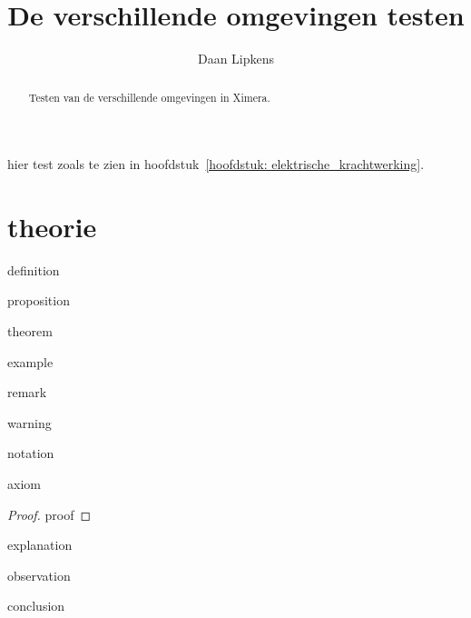 \documentclass{ximera}
\title{De verschillende omgevingen testen}
\author{Daan Lipkens}
\begin{document}
 \begin{abstract}
     Testen van de verschillende omgevingen in Ximera.
 \end{abstract}
\maketitle

hier test zoals te zien in hoofdstuk~\ref{hoofdstuk: elektrische_krachtwerking}.

\section{theorie}
\begin{definition}
definition
\end{definition}

\begin{proposition}
proposition
\end{proposition}

\begin{theorem}
theorem
\end{theorem}

\begin{example}
example
\end{example}

\begin{remark}
remark
\end{remark}

\begin{warning}
warning
\end{warning}

\begin{notation}
notation
\end{notation}

\begin{axiom}
axiom
\end{axiom}

\begin{proof}
proof
\end{proof}

\begin{explanation}
explanation
\end{explanation}

\begin{observation}
observation
\end{observation}

\begin{conclusion}
conclusion
\end{conclusion}
\end{document}
